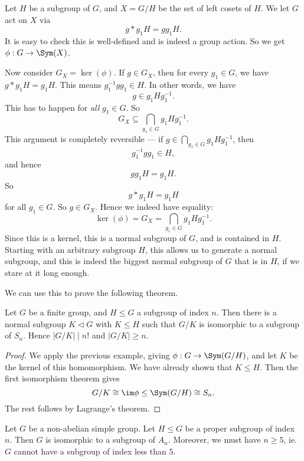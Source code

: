 \documentclass[a4paper]{article}
\begin{document}
\begin{eg}
  Let $H$ be a subgroup of $G$, and $X = G/H$ be the set of left cosets of $H$. We let $G$ act on $X$ via
  \[
    g* g_1 H = gg_1 H.
  \]
  It is easy to check this is well-defined and is indeed a group action. So we get $\phi: G \to \Sym(X)$.

  Now consider $G_X = \ker(\phi)$. If $g \in G_X$, then for every $g_1 \in G$, we have $g * g_1 H = g_1H$. This means $g_1^{-1} gg_1 \in H$. In other words, we have
  \[
    g \in g_1 H g_1^{-1}.
  \]
  This has to happen for \emph{all} $g_1 \in G$. So
  \[
    G_X \subseteq \bigcap_{g_1 \in G} g_1 Hg_1^{-1}.
  \]
  This argument is completely reversible --- if $g \in \bigcap_{g_1 \in G} g_1 Hg_1^{-1}$, then
  \[
    g_1^{-1}g g_1 \in H,
  \]
  and hence
  \[
    gg_1 H = g_1H.
  \]
  So
  \[
    g* g_1 H = g_1 H
  \]
  for all $g_1 \in G$. So $g \in G_X$. Hence we indeed have equality:
  \[
    \ker (\phi) = G_X = \bigcap_{g_1 \in G} g_1 Hg_1^{-1}.
  \]
  Since this is a kernel, this is a normal subgroup of $G$, and is contained in $H$. Starting with an arbitrary subgroup $H$, this allows us to generate a normal subgroup, and this is indeed the biggest normal subgroup of $G$ that is in $H$, if we stare at it long enough.
\end{eg}

We can use this to prove the following theorem.
\begin{thm}
  Let $G$ be a finite group, and $H \leq G$ a subgroup of index $n$. Then there is a normal subgroup $K \lhd G$ with $K \leq H$ such that $G/K$ is isomorphic to a subgroup of $S_n$. Hence $|G/K| \mid n!$ and $|G/K| \geq n$.
\end{thm}

\begin{proof}
  We apply the previous example, giving $\phi: G \to \Sym(G/H)$, and let $K$ be the kernel of this homomorphism. We have already shown that $K \leq H$. Then the first isomorphism theorem gives
  \[
    G/K \cong \im \phi \leq \Sym(G/H) \cong S_n.
  \]
  The rest follows by Lagrange's theorem.
\end{proof}

\begin{cor}
  Let $G$ be a non-abelian simple group. Let $H \leq G$ be a proper subgroup of index $n$. Then $G$ is isomorphic to a subgroup of $A_n$. Moreover, we must have $n \geq 5$, ie. $G$ cannot have a subgroup of index less than $5$.
\end{cor}
\end{document}
